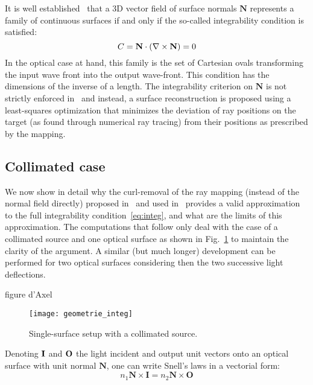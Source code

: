 It is well established~\cite{Fournier2010,Ries2002} that a 3D vector
field of surface normals $\mathbf{N}$ represents a family of
continuous surfaces if and only if the so-called integrability
condition is satisfied:
\begin{equation}
  C = \mathbf{N} \cdot (\nabla \times \mathbf{N}) = 0
  \label{eq:integ}
\end{equation}
In the optical case at hand, this family is the set of Cartesian ovals
transforming the input wave front into the output wave-front.
This condition has the dimensions of the inverse of a length. The
integrability criterion on $\mathbf{N}$ is not strictly enforced
in~\cite{Baeuerle2012} and instead, a surface reconstruction is
proposed using a least-squares optimization that minimizes the
deviation of ray positions on the target (as found through numerical
ray tracing) from their positions as prescribed by the mapping.


\subsection{Collimated case}

We now show in detail why the curl-removal of the ray mapping (instead
of the normal field directly) proposed in~\cite{Baeuerle2012} and used
in~\cite{Bruneton2012} provides
a valid approximation to the full integrability
condition~\eqref{eq:integ}, and what are the limits of this
approximation.  The computations that follow only deal with the case
of a collimated source and one optical surface as shown in
Fig.~\ref{fig:1surf-setup} to maintain the clarity of the argument. 
A similar (but much longer) development can be performed for two optical
surfaces considering then the two successive light deflections.

\TODO figure d'Axel

\begin{figure}[!htbp]
  \centering 
  \texttt{[image: geometrie\_integ]}
  \caption{Single-surface setup with a collimated source.}
  \label{fig:1surf-setup}
\end{figure}

Denoting $\mathbf{I}$ and $\mathbf{O}$ the light incident and output unit vectors onto 
an optical surface with unit normal $\mathbf{N}$, one can write 
Snell's laws in a vectorial form\cite{Benitez2004b}:
\begin{equation}
  n_1 \mathbf{N} \times \mathbf{I} = n_2 \mathbf{N} \times \mathbf{O} 
  \label{eq:snell}
\end{equation}

